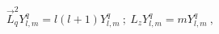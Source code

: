 \begin{equation}
\vec L_q^2Y_{l,m}^q=l(l+1)Y_{l,m}^q \ ; \ L_zY_{l,m}^q=mY_{l,m}^q \ ,
\end{equation}

